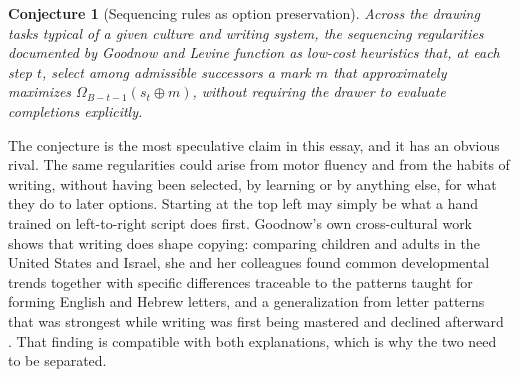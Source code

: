 \documentclass[11pt]{article}
\newtheorem{conjecture}{Conjecture}
\theoremstyle{remark}
\begin{document}
\begin{conjecture}[Sequencing rules as option preservation]
\label{conj:option}
Across the drawing tasks typical of a given culture and writing system, the sequencing regularities documented by Goodnow and Levine function as low-cost heuristics that, at each step $t$, select among admissible successors a mark $m$ that approximately maximizes $\Omega_{B-t-1}(s_t \oplus m)$, without requiring the drawer to evaluate completions explicitly.
\end{conjecture}

The conjecture is the most speculative claim in this essay, and it has an obvious rival. The same regularities could arise from motor fluency and from the habits of writing, without having been selected, by learning or by anything else, for what they do to later options. Starting at the top left may simply be what a hand trained on left-to-right script does first. Goodnow's own cross-cultural work shows that writing does shape copying: comparing children and adults in the United States and Israel, she and her colleagues found common developmental trends together with specific differences traceable to the patterns taught for forming English and Hebrew letters, and a generalization from letter patterns that was strongest while writing was first being mastered and declined afterward \cite{goodnow1973direction}. That finding is compatible with both explanations, which is why the two need to be separated.
\end{document}
